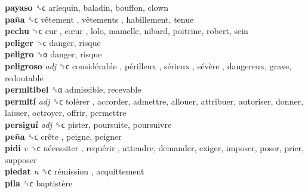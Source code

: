\textbf{payaso} ␝ϲ  arlequin, baladin, bouffon, clown  \\
\textbf{paña} ␝ϲ   vêtement ,  vêtements , habillement, tenue  \\
\textbf{pechu} ␝ϲ   cur ,  cœur , lolo, mamelle, nibard, poitrine, robert, sein  \\
\textbf{peliger} ␝ϲ  danger, risque  \\
\textbf{peligro} ␝α  danger, risque  \\
\textbf{peligroso} \emph{adj}  ␝ϲ   considérable ,  périlleux ,  sérieux ,  sévère , dangereux, grave, redoutable  \\
\textbf{permitibel} ␝α  admissible, recevable  \\
\textbf{permití} \emph{adj}  ␝ϲ   tolérer , accorder, admettre, allouer, attribuer, autoriser, donner, laisser, octroyer, offrir, permettre  \\
\textbf{persiguí} \emph{adj}  ␝ϲ  pister, poursuite, poursuivre  \\
\textbf{peña} ␝ϲ   crête , peigne, peigner  \\
\textbf{pidi} \emph{v}  ␝ϲ   nécessiter ,  requérir , attendre, demander, exiger, imposer, poser, prier, supposer  \\
\textbf{piedat} \emph{n}  ␝ϲ   rémission , acquittement  \\
\textbf{pila} ␝ϲ   baptistère   \\

